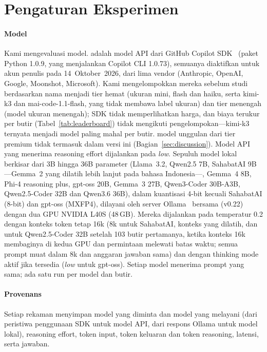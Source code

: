 \section{Pengaturan Eksperimen}
\label{sec:setup}

\paragraph{Model} Kami mengevaluasi \NModels{} model. \NApi{} adalah model API dari GitHub Copilot SDK~\cite{copilotsdk2026} (paket Python 1.0.9, yang menjalankan Copilot CLI 1.0.73), semuanya diaktifkan untuk akun penulis pada 14~Oktober~2026, dari lima vendor (Anthropic, OpenAI, Google, Moonshot, Microsoft). Kami mengelompokkan mereka sebelum studi berdasarkan nama menjadi tier hemat (ukuran mini, flash dan haiku, serta kimi-k3 dan mai-code-1.1-flash, yang tidak membawa label ukuran) dan tier menengah (model ukuran menengah); SDK tidak memperlihatkan harga, dan biaya terukur per butir (Tabel~\ref{tab:leaderboard}) tidak mengikuti pengelompokan---kimi-k3 ternyata menjadi model paling mahal per butir. \NPremium{} model unggulan dari tier premium tidak termasuk dalam versi ini (Bagian~\ref{sec:discussion}). Model API yang menerima reasoning effort dijalankan pada \emph{low}. Sepuluh model lokal berkisar dari 3B hingga 36B parameter (Llama~3.2, Qwen2.5 7B, SahabatAI 9B---Gemma~2 yang dilatih lebih lanjut pada bahasa Indonesia---, Gemma~4 8B, Phi-4 reasoning plus, gpt-oss 20B, Gemma~3 27B, Qwen3-Coder 30B-A3B, Qwen2.5-Coder 32B dan Qwen3.6 36B), dalam kuantisasi 4-bit kecuali SahabatAI (8-bit) dan gpt-oss (MXFP4), dilayani oleh server Ollama~\cite{ollama} bersama (v0.22) dengan dua GPU NVIDIA L40S (48\,GB). Mereka dijalankan pada temperatur 0.2 dengan konteks token tetap 16k (8k untuk SahabatAI, konteks yang dilatih, dan untuk Qwen2.5-Coder 32B setelah 103 butir pertamanya, ketika konteks 16k membaginya di kedua GPU dan permintaan melewati batas waktu; semua prompt muat dalam 8k dan anggaran jawaban sama) dan dengan thinking mode aktif jika tersedia (\emph{low} untuk gpt-oss). Setiap model menerima prompt yang sama; ada satu run per model dan butir.

\paragraph{Provenans} Setiap rekaman menyimpan model yang diminta dan model yang melayani (dari peristiwa penggunaan SDK untuk model API, dari respons Ollama untuk model lokal), reasoning effort, token input, token keluaran dan token reasoning, latensi, serta jawaban.

